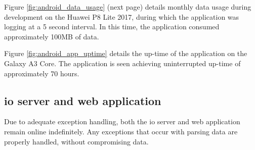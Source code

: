 Figure \ref{fig:android_data_usage} (next page) details monthly data usage during development on the Huawei P8 Lite 2017, during which the application was logging at a 5 second interval.
In this time, the application consumed approximately 100MB of data.

Figure \ref{fig:android_app_uptime} details the up-time of the application on the Galaxy A3 Core.
The application is seen achieving uninterrupted up-time of approximately 70 hours.

\pagebreak
\subsection{\Ac{io} server and web application}
Due to adequate exception handling, both the \ac{io} server and web application remain online indefinitely.
Any exceptions that occur with parsing data are properly handled, without compromising data.

\pagebreak
